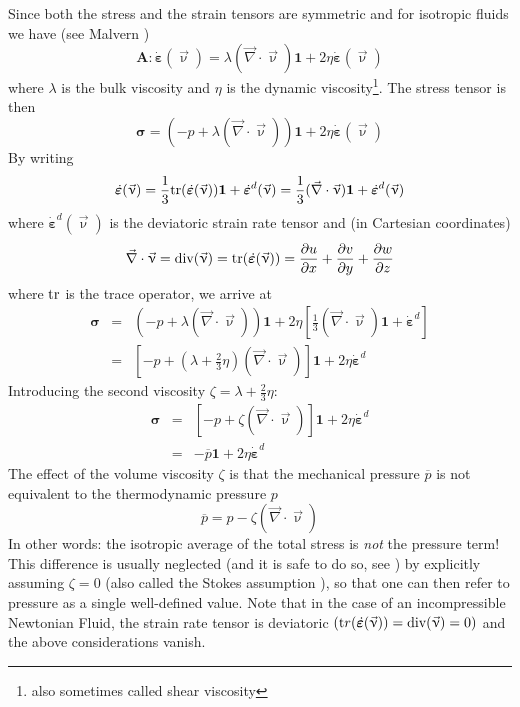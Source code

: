 Since both the stress and the strain tensors are symmetric and for isotropic 
fluids we have (see Malvern \cite{malvern})
\begin{equation}
{\bm A}:\dot{\bm \varepsilon}(\vec\upnu) 
= \lambda (\vec\nabla\cdot\vec\upnu) {\bm 1} + 2\eta \dot{\bm \varepsilon}(\vec\upnu)
\end{equation}
where $\lambda$ is the bulk viscosity and $\eta$ is the dynamic viscosity\footnote{also sometimes called shear viscosity}. 
The stress tensor is then 
\begin{equation}
{\bm \sigma} = (-p  + \lambda (\vec\nabla\cdot\vec\upnu)) {\bm 1} + 2\eta \dot{\bm \varepsilon}(\vec\upnu)
\end{equation}
By writing 
\[
\dot{\bm \varepsilon}(\vec\upnu) 
= \frac{1}{3}{\rm tr}(\dot{\bm \varepsilon}(\vec\upnu)) {\bm 1} + \dot{\bm \varepsilon}^d(\vec\upnu) =
 \frac{1}{3}(\vec\nabla\cdot\vec\upnu) {\bm 1} + \dot{\bm \varepsilon}^d (\vec\upnu)
\]
where $\dot{\bm \varepsilon}^d(\vec\upnu)$ is the deviatoric strain rate tensor and 
(in Cartesian coordinates)
\begin{equation}
\vec\nabla\cdot\vec\upnu = 
\text{div} (\vec\upnu ) =
{\rm tr}(\dot{\bm \varepsilon}(\vec\upnu)) =
\frac{\partial u}{\partial x}+ 
\frac{\partial v}{\partial y}+ 
\frac{\partial w}{\partial z} 
\end{equation} 
where ${\rm tr}$ is the trace operator, we arrive at
\begin{eqnarray}
{\bm \sigma} 
&=& (-p+\lambda(\vec\nabla\cdot\vec\upnu)) {\bm 1} + 2\eta \left[ \frac{1}{3}(\vec\nabla\cdot\vec\upnu) {\bm 1} + \dot{\bm \varepsilon}^d \right] \\
&=& \left[ -p+\left(\lambda+\frac{2}{3}\eta\right)(\vec\nabla\cdot\vec\upnu)\right] {\bm 1} + 2\eta  \dot{\bm \varepsilon}^d  
\end{eqnarray}
Introducing the second viscosity $\zeta=\lambda+\frac{2}{3}\eta$:
\begin{eqnarray}
{\bm \sigma} 
&=& \left[ -p+ \zeta (\vec\nabla\cdot\vec\upnu)\right] {\bm 1} + 2\eta  \dot{\bm \varepsilon}^d \\ 
&=&  -\overline{p} {\bm 1} + 2\eta  \dot{\bm \varepsilon}^d  
\end{eqnarray}
The effect of the volume viscosity $\zeta$ is that the mechanical pressure $\overline{p}$
is not equivalent to the thermodynamic pressure $p$ 
\begin{equation}
\overline{p}=p - \zeta (\vec\nabla\cdot\vec\upnu)
\end{equation}
In other words: the isotropic average of the total stress is {\sl not} the pressure term!
This difference is usually neglected (and it is safe to do so, see \cite[section 7.02.3.2.2]{berc09}) 
by explicitly assuming $\zeta=0$ (also called the Stokes assumption \cite[p256]{scto01}), 
so that one can then refer to pressure as a single well-defined value.
Note that in the case of an incompressible Newtonian Fluid, 
the strain rate tensor is deviatoric $({\text tr}(\dot{\bm \varepsilon}(\vec\upnu)) 
= \text{div}(\vec\upnu) =0)$ and the above considerations vanish.

